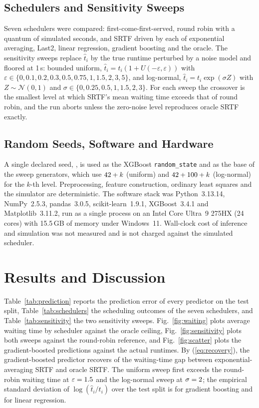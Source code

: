 \documentclass[conference]{IEEEtran}
\begin{document}
\subsection{Schedulers and Sensitivity Sweeps}
Seven schedulers were compared: first-come-first-served, round robin with a
quantum of \quantumValue{} simulated seconds, and SRTF driven by each of
exponential averaging, Last2, linear regression, gradient boosting and the
oracle. The sensitivity sweeps replace $\hat{t}_i$ by the true runtime
perturbed by a noise model and floored at 1\,s: bounded uniform,
$\hat{t}_i = t_i (1 + U(-\varepsilon, \varepsilon))$ with
$\varepsilon \in \{0, 0.1, 0.2, 0.3, 0.5, 0.75, 1, 1.5, 2, 3, 5\}$, and
log-normal, $\hat{t}_i = t_i \exp(\sigma Z)$ with $Z \sim \mathcal{N}(0, 1)$
and $\sigma \in \{0, 0.25, 0.5, 1, 1.5, 2, 3\}$. For each sweep the crossover
is the smallest level at which SRTF's mean waiting time exceeds that of
round robin, and the run aborts unless the zero-noise level reproduces
oracle SRTF exactly.

\subsection{Random Seeds, Software and Hardware}
A single declared seed, \seedValue{}, is used as the XGBoost
\texttt{random\_state} and as the base of the sweep generators, which use
$42{} + k$ (uniform) and $42{} + 100 + k$ (log-normal) for
the $k$-th level. Preprocessing, feature construction, ordinary least
squares and the simulator are deterministic. The software stack was
Python~3.13.14, NumPy~2.5.3, pandas~3.0.5, scikit-learn~1.9.1,
XGBoost~3.4.1 and Matplotlib~3.11.2, run as a single process on an Intel
Core Ultra~9 275HX (24 cores) with 15.5\,GB of memory under Windows~11.
Wall-clock cost of inference and simulation was not measured and is not
charged against the simulated scheduler.

\section{Results and Discussion}
\label{sec:results}

Table~\ref{tab:prediction} reports the prediction error of every predictor on
the test split, Table~\ref{tab:schedulers} the scheduling outcomes of the
seven schedulers, and Table~\ref{tab:sensitivity} the two sensitivity sweeps.
Fig.~\ref{fig:waiting} plots average waiting time by scheduler against the
oracle ceiling, Fig.~\ref{fig:sensitivity} plots both sweeps against the
round-robin reference, and Fig.~\ref{fig:scatter} plots the gradient-boosted
predictions against the actual runtimes. By (\ref{eq:recovery}), the
gradient-boosted predictor recovers \headline{} of the waiting-time gap
between exponential-averaging SRTF and oracle SRTF. The uniform sweep first
exceeds the round-robin waiting time at $\varepsilon = 1.5$ and
the log-normal sweep at $\sigma = 2$; the empirical
standard deviation of $\log(\hat{t}_i / t_i)$ over the test split is
\sigmaGBM{} for gradient boosting and \sigmaLinear{} for linear regression.
\end{document}
